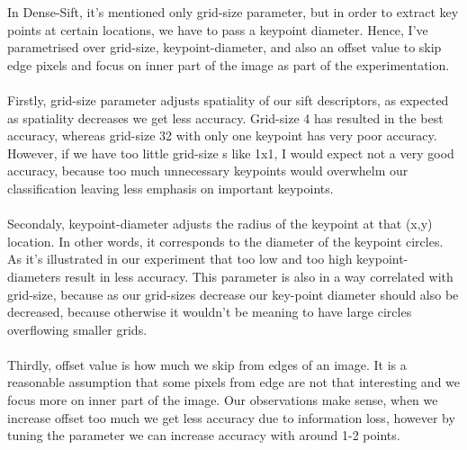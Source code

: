 \documentclass[12pt]{article}
\begin{document}
\begin{center}
        \vspace*{0.5cm}

        In Dense-Sift, it's mentioned only grid-size parameter, but in order to extract key points at certain locations, we have to pass a keypoint diameter.
        Hence, I've parametrised over grid-size, keypoint-diameter, and also an offset value to skip edge pixels and focus on inner part of the image as part of the experimentation.
        \\~\\
        Firstly, grid-size parameter adjusts spatiality of our sift descriptors, as expected as spatiality decreases we get less accuracy.
        Grid-size 4 has resulted in the best accuracy, whereas grid-size 32 with only one keypoint has very poor accuracy.
        However, if we have too little grid-size s like 1x1, I would expect not a very good accuracy, because too much unnecessary keypoints would overwhelm our classification leaving less emphasis on important keypoints.
        \\~\\
        Secondaly, keypoint-diameter adjusts the radius of the keypoint at that (x,y) location. In other words, it corresponds to the diameter of the keypoint circles.
        As it's illustrated in our experiment that too low and too high keypoint-diameters result in less accuracy. This parameter is also in a way correlated with grid-size, because as our grid-sizes decrease
        our key-point diameter should also be decreased, because otherwise it wouldn't be meaning to have large circles overflowing smaller grids.
        \\~\\
        Thirdly, offset value is how much we skip from edges of an image.
        It is a reasonable assumption that some pixels from edge are not that interesting and we focus more on inner part of the image.
        Our observations make sense, when we increase offset too much we get less accuracy due to information loss, however by tuning the parameter we can increase accuracy with around 1-2 points.

    \end{center}
\end{document}
